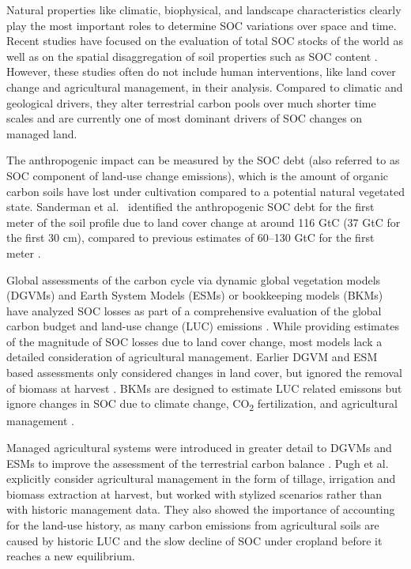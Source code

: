 \documentclass[gc, manuscript]{copernicus}
\begin{document}
Natural properties like climatic, biophysical, and landscape characteristics clearly play the most important roles to determine SOC variations over space and time. Recent studies have focused on the evaluation of total SOC stocks of the world as well as on the spatial disaggregation of soil properties such as SOC content \citep{batjes_harmonized_2016, hengl_soilgrids250m_2017, fao_global_2018}. However, these studies often do not include human interventions, like land cover change and agricultural management, in their analysis. Compared to climatic and geological drivers, they alter terrestrial carbon pools over much shorter time scales and are currently one of most dominant drivers of SOC changes on managed land.

The anthropogenic impact can be measured by the SOC debt (also referred to as SOC component of land-use change emissions), which is the amount of organic carbon soils have lost under cultivation compared to a potential natural vegetated state. Sanderman et al.~\citeyearpar{sanderman_soil_2017} identified the anthropogenic SOC debt for the first meter of the soil profile due to land cover change at around 116 GtC (37 GtC for the first 30 cm), compared to previous estimates of 60--130 GtC for the first meter \citep{lal_world_2001}.

Global assessments of the carbon cycle via dynamic global vegetation models (DGVMs) and Earth System Models (ESMs) or bookkeeping models (BKMs) have analyzed SOC losses as part of a comprehensive evaluation of the global carbon budget and land-use change (LUC) emissions \citep{friedlingstein_global_2019}. While providing estimates of the magnitude of SOC losses due to land cover change, most models lack a detailed consideration of agricultural management. Earlier DGVM and ESM based assessments only considered changes in land cover, but ignored the removal of biomass at harvest \citep{strassmann_simulating_2008, betts_climate_2015}. BKMs are designed to estimate LUC related emissons but ignore changes in SOC due to climate change, CO\textsubscript{2} fertilization, and agricultural management \citep{friedlingstein_global_2019, houghton_carbon_2012, hansis_relevance_2015}.

Managed agricultural systems were introduced in greater detail to DGVMs and ESMs to improve the assessment of the terrestrial carbon balance \citep[e.g.~][]{bondeau_modelling_2007, lindeskog_implications_2013}. Pugh et al.~\citeyearpar{pugh_simulated_2015} explicitly consider agricultural management in the form of tillage, irrigation and biomass extraction at harvest, but worked with stylized scenarios rather than with historic management data. They also showed the importance of accounting for the land-use history, as many carbon emissions from agricultural soils are caused by historic LUC and the slow decline of SOC under cropland before it reaches a new equilibrium.
\end{document}
